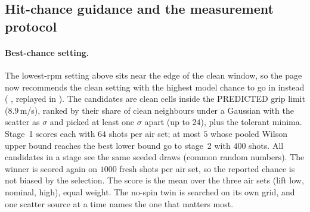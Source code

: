 \subsection{Hit-chance guidance and the measurement protocol}
\label{sec:field-chance}

\paragraph{Best-chance setting.} The lowest-rpm setting above sits near the edge of the clean window, so
the page now recommends the clean setting with the highest model chance to go in instead
( , replayed in  ). The
candidates are clean cells inside the PREDICTED grip limit ($8.9$\,m/s), ranked by their share of clean
neighbours under a Gaussian with the scatter as $\sigma$ and picked at least one $\sigma$ apart (up to $24$),
plus the tolerant minima. Stage~1 scores each with $64$ shots per air set; at most $5$ whose pooled Wilson
upper bound reaches the best lower bound go to stage~2 with $400$ shots. All candidates in a stage see the
same seeded draws (common random numbers). The winner is scored again on $1000$ fresh shots per air set, so
the reported chance is not biased by the selection. The score is the mean over the three air sets (lift low,
nominal, high), equal weight\assumed. The no-spin twin is searched on its own grid, and one scatter source at a
time names the one that matters most.


